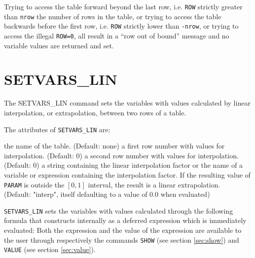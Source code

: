 
Trying to access the table forward beyond the last row, i.e. \texttt{ROW}
strictly greater than {\tt nrow} the number of rows in the table, or
trying to access the table backwards before the first row, i.e. \texttt{ROW}
strictly lower than {\tt -nrow}, or trying to access the illegal
\texttt{ROW=0}, all result in a ``row out of bound'' message and no
variable values are returned and set.  



\section{SETVARS\_LIN}
\label{sec:setvars_lin}

The SETVARS\_LIN command sets the variables with values calculated
by linear interpolation, or extrapolation, between two rows of a table. 


The attributes of \texttt{SETVARS\_LIN} are:
\begin{madlist}
   the name of the table. (Default: none)
   a first row number with values for interpolation. (Default: 0)
   a second row number with values for interpolation. (Default: 0)
   a string containing the linear interpolation factor or
  the name of a variable or expression containing the interpolation
  factor. If the resulting value of \texttt{PARAM} is outside the
  $[0,1]$ interval, the result is a linear extrapolation. \\
  (Default: "interp", itself defaulting to a value of 0.0 when evaluated)
\end{madlist}

\texttt{SETVARS\_LIN} sets the variables with values calculated through
the following formula that \madx constructs internally as a deferred
expression which is immediately evaluated:
Both the expression and the value of the expression are available to the
user through respectively the commands \texttt{SHOW} (see section
\ref{sec:show}) and \texttt{VALUE} (see section \ref{sec:value}).

